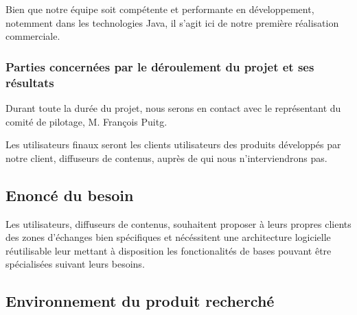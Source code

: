 Bien que notre équipe soit compétente et performante en développement, notemment dans les technologies Java, il s'agit ici de notre première réalisation commerciale.



\subsubsection{Parties concernées par le déroulement du projet et ses résultats}

Durant toute la durée du projet, nous serons en contact avec le représentant du comité de
pilotage, M. François Puitg.

Les utilisateurs finaux seront les clients utilisateurs des produits développés par notre client,
diffuseurs de contenus, auprès de qui nous n'interviendrons pas.

\subsection{Enoncé du besoin}
Les utilisateurs, diffuseurs de contenus, souhaitent proposer à leurs propres clients
des zones d'échanges bien spécifiques et nécéssitent une architecture logicielle
réutilisable leur mettant à disposition les fonctionalités de bases pouvant être
spécialisées suivant leurs besoins.

\subsection{Environnement du produit recherché}

